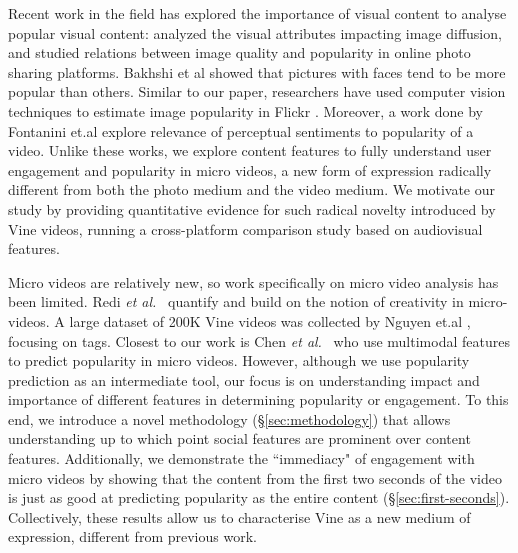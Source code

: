 Recent work in the field has explored the importance of visual content to analyse popular visual content: \cite{totti14impact} analyzed the visual attributes impacting image diffusion,  and \cite{schifanella2015image} studied relations between image quality and popularity in online photo sharing platforms.  Bakhshi et al  \cite{bakhshi2014faces} showed that pictures with faces tend to be more popular than others. Similar to our paper, researchers have used computer vision techniques to estimate image popularity in Flickr \cite{Khosla:2014}. Moreover, a work done by Fontanini et.al \cite{fontanini2016web} explore relevance of perceptual sentiments to popularity of a video. 
Unlike these works, we  explore content features to fully understand user engagement and popularity in micro videos, a new form of expression radically different from both the photo medium and the video medium. We motivate our study by providing quantitative evidence for such radical novelty introduced by Vine videos, running a cross-platform comparison study based on audiovisual features.  

Micro videos are relatively new, so work specifically on micro video analysis has been limited. Redi \textsl{et al.}~\cite{redi20146} quantify and build on the notion of creativity in micro-videos. A large dataset of 200K Vine videos was collected by Nguyen et.al \cite{nguyen2016open}, focusing on tags. Closest to our work is Chen \textsl{et al.}~\cite{Chen:2016:MTM:2964284.2964314} who use multimodal features to predict popularity in micro videos. However, although we use popularity prediction as an intermediate tool, our focus is on understanding impact and importance of different features in determining popularity or engagement. To this end, we introduce a novel methodology (\S\ref{sec:methodology}) that allows understanding up to which point social features are prominent over content features. Additionally, we demonstrate the ``immediacy" of engagement with micro videos by showing that the content from the first two seconds of the video is just as good at predicting  popularity as the entire content (\S\ref{sec:first-seconds}). Collectively, these results allow us to characterise Vine as a new medium of expression, different from previous work. %
\\
\\


